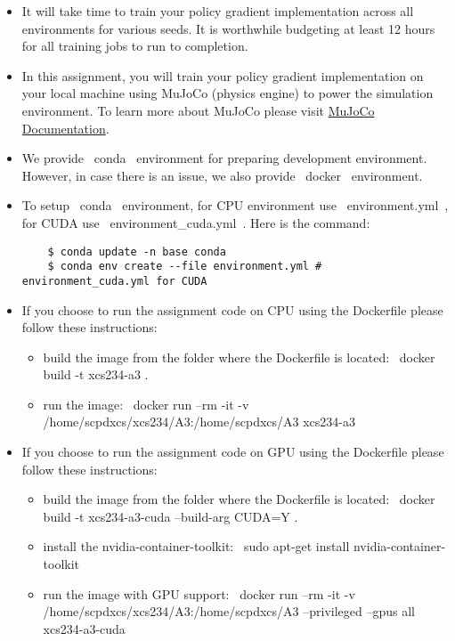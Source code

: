 \begin{itemize}
  \item It will take time to train your policy gradient implementation across all environments for various seeds. It is worthwhile budgeting at least 12 hours for all training jobs to run to completion.

  \item In this assignment, you will train your policy gradient implementation on your local machine using MuJoCo (physics engine) to power the simulation environment. To learn more about MuJoCo please visit \href{https://mujoco.readthedocs.io/en/latest/overview.html}{MuJoCo Documentation}.

  \item We provide ~conda~ environment for preparing development environment. However, in case there is an issue, we also provide ~docker~ environment.

  \item To setup ~conda~ environment, for CPU environment use ~environment.yml~, for CUDA use ~environment_cuda.yml~. Here is the command:
    \begin{lstlisting}
    $ conda update -n base conda
    $ conda env create --file environment.yml #  environment_cuda.yml for CUDA
    \end{lstlisting}
  \item If you choose to run the assignment code on CPU using the Dockerfile please follow these instructions:
    \begin{itemize}
        \item build the image from the folder where the Dockerfile is located: ~docker build -t xcs234-a3 .~
        \item run the image:  ~docker run --rm -it -v /home/scpdxcs/xcs234/A3:/home/scpdxcs/A3 xcs234-a3~
    \end{itemize}

  \item If you choose to run the assignment code on GPU using the Dockerfile please follow these instructions:
    \begin{itemize}
        \item build the image from the folder where the Dockerfile is located: ~docker build -t xcs234-a3-cuda --build-arg CUDA=Y .~
        \item install the nvidia-container-toolkit: ~sudo apt-get install nvidia-container-toolkit~
        \item run the image with GPU support: ~docker run --rm -it -v /home/scpdxcs/xcs234/A3:/home/scpdxcs/A3 --privileged --gpus all xcs234-a3-cuda~
    \end{itemize}


\end{itemize}
